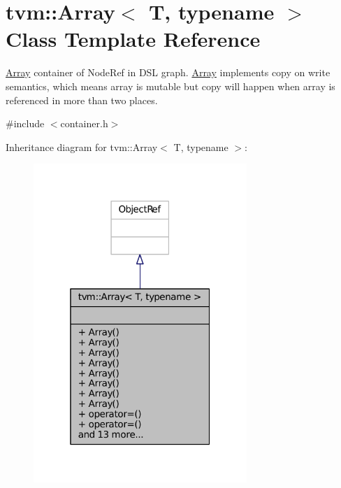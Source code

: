 \hypertarget{classtvm_1_1Array}{}\section{tvm\+:\+:Array$<$ T, typename $>$ Class Template Reference}
\label{classtvm_1_1Array}


\hyperlink{classtvm_1_1Array}{Array} container of Node\+Ref in D\+SL graph. \hyperlink{classtvm_1_1Array}{Array} implements copy on write semantics, which means array is mutable but copy will happen when array is referenced in more than two places.  




{\ttfamily \#include $<$container.\+h$>$}



Inheritance diagram for tvm\+:\+:Array$<$ T, typename $>$\+:
\nopagebreak
\begin{figure}[H]
\begin{center}
\leavevmode
\includegraphics[width=229pt]{classtvm_1_1Array__inherit__graph}
\end{center}
\end{figure}


